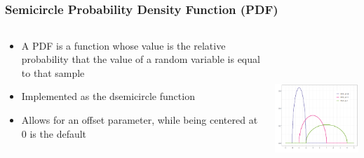 \documentclass[handout, xcolor=dvipsnames]{beamer}
\begin{document}
\subsection{}
\begin{frame}
	\frametitle{Semicircle Probability Density Function (PDF)}
            \begin{columns}[T]
                \begin{column}{.4\textwidth}
            	\begin{itemize}
                	\item A PDF is a function whose value is the relative probability that the value of a random variable is equal to that sample
                        \item Implemented as the dsemicircle function
                        \item Allows for an offset parameter, while being centered at 0 is the default
                    \end{itemize}
                \end{column}
                \begin{column}{.6\textwidth}
                    \includegraphics[width=6.5cm,height=6cm]{Figures/PDF_plot_shift.png}
                \end{column}
            \end{columns}
\end{frame}
\end{document}
